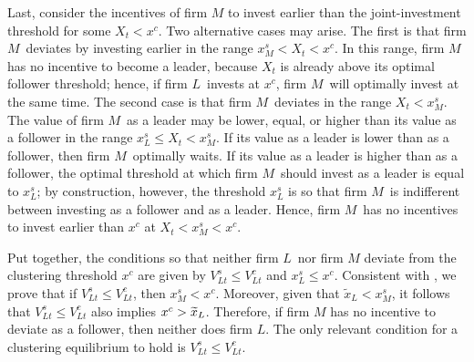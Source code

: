\documentclass[nogrid,nosurname,sort&compress]{RFS}
\begin{document}
Last, consider the incentives of firm $M$ to invest earlier than the joint-investment threshold
for some $X_{t}<x^{c}$. Two alternative cases may arise. The first is that firm $M$\ deviates
by investing earlier in the range $x_{M}^{s}<X_{t}<x^{c}$. In this range, firm $M$ has no
incentive to become a leader, because $X_{t}$ is already above its optimal follower threshold;
hence, if firm $L$\ invests at $x^{c}$, firm $M$\ will optimally invest at the same time. The
second case is that firm $M$\ deviates in the range $X_{t}<x_{M}^{s}$. The value of firm $M$\ as
a leader may be lower, equal, or higher than its value as a follower in the range $x_{L}^{s}\leq
X_{t}<x_{M}^{s}$. If its value as a leader is lower than as a follower, then firm $M$\ optimally
waits. If its value as a leader is higher than as a follower, the optimal threshold at which
firm $M $\ should invest as a leader is equal to $x_{L}^{s}$; by construction, however, the
threshold $x_{L}^{s}$ is so that firm $M$\ is indifferent between investing as a follower and as a
leader. Hence, firm $M$\ has no incentives to invest earlier than $x^{c}$ at
$X_{t}<x_{M}^{s}<x^{c}$.

Put together, the conditions so that neither firm $L$\ nor firm $M$ deviate from the clustering
threshold $x^{c}$ are given by $V_{Lt}^{s}\leq
V_{Lt}^{c}$ and $x_{L}^{s}\leq x^{c}$. Consistent with \cite%
{pawlina2006}, we prove that if $V_{Lt}^{s}\leq V_{Lt}^{c}$, then $%
x_{M}^{s}<x^{c}.$ Moreover, given that $\widetilde{x}_{L}<x_{M}^{s}$, it
follows that $V_{Lt}^{s}\leq V_{Lt}^{c}$ also implies $x^{c}>\widetilde{%
x}_{L}$. Therefore, if firm $M$ has no incentive to deviate as a follower, then neither does
firm $L$. The only relevant condition for a clustering equilibrium to hold is $V_{Lt}^{s}\leq
V_{Lt}^{c}$.
\end{document}
